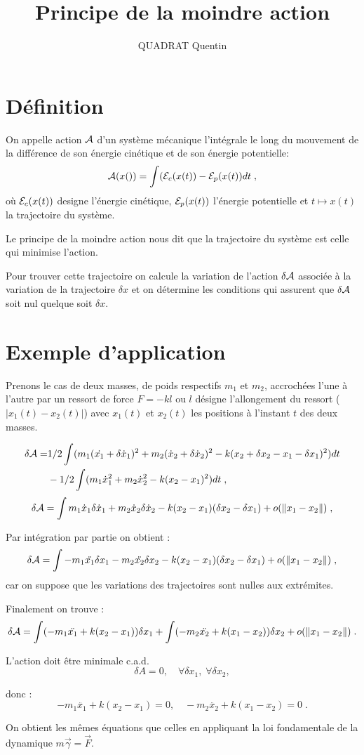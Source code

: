 \documentclass[a4paper,11pt]{amsart}
\title{Principe de la moindre action}
\author{QUADRAT Quentin}
\begin{document}
\maketitle

\section{D\'efinition}
On appelle action ${\mathcal A}$ d'un syst\`eme m\'ecanique l'int\'egrale
le long du mouvement de la diff\'erence de son \'energie cin\'etique et
de son \'energie potentielle:
$${\mathcal A}(x()) = \int ({\mathcal E}_c(x(t)) - {\mathcal E}_p(x(t))dt\;,$$
o\`u  ${\mathcal E}_c(x(t))$ designe l'\'energie cin\'etique, ${\mathcal E}_p(x(t))$
l'\'energie potentielle et $t\mapsto x(t)$ la trajectoire du syst\`eme.

Le principe de la moindre action nous dit que la trajectoire
du syst\`eme est celle qui minimise l'action.

Pour trouver cette trajectoire on calcule la variation de
l'action $\delta {\mathcal A}$ associ\'ee \`a la variation de la trajectoire
$\delta x$ et on d\'etermine les conditions qui assurent que
$\delta {\mathcal A}$ soit nul quelque soit $\delta x$.

\section{Exemple d'application}
Prenons le cas de deux masses, de poids respectifs $m_1$ et $m_2$,
accroch\'ees l'une \`a l'autre par un ressort de force $F =
-kl$ ou $l$ d\'esigne l'allongement du ressort ($|x_1(t)-x_2(t)|$)
avec  $x_1(t)$ et $x_2(t)$ les positions \`a l'instant $t$ des deux masses.

\begin{align*}
\delta {\mathcal A} =& 1/2\int (m_1(\dot{x_1}+\delta \dot{x}_1)^2+
 m_2( \dot{x}_2+\delta \dot{x}_2)^2-
 k(x_2+\delta x_2-x_1-\delta x_1)^2) dt\\
 &-1/2\int (m_1\dot{x}_1^2+m_2\dot{x}_2^2-k(x_2-x_1)^2)dt \;,
\end{align*}
$$\delta {\mathcal A} = \int m_1\dot{x}_1\delta \dot{x}_1+m_2\dot{x}_2 \delta
\dot{x}_2-k(x_2-x_1) (\delta x_2-\delta x_1)+o(\| x_1-x_2\|)\;,$$

Par int\'egration par partie on obtient :
$$\delta {\mathcal A} = \int -m_1\ddot{x_1}\delta x_1 -m_2\ddot{x_2}\delta x_2
- k(x_2-x_1)(\delta x_2-\delta x_1) + o(\| x_1-x_2\|)\;,$$
car on
suppose que les variations des trajectoires sont nulles aux
extr\'emites.

Finalement on trouve :
$$\delta {\mathcal A} =\int (-m_1\ddot{x_1}+k(x_2-x_1))\delta x_1 + \int
(-m_2\ddot{x_2}+k(x_1-x_2))\delta x_2 + o(\| x_1-x_2\|)\;.$$

L'action doit \^etre minimale c.a.d. $$\delta A = 0,\quad\forall
\delta x_1,\;\forall \delta x_2,$$

donc :
$$-m_1\ddot{x_1}+k(x_2-x_1) = 0,\quad-m_2\ddot{x_2}+k(x_1-x_2) = 0\;.$$

On obtient les m\^emes \'equations que celles en appliquant la loi
fondamentale de la dynamique $m\vec{\gamma} = \vec{F}$.
\end{document}

